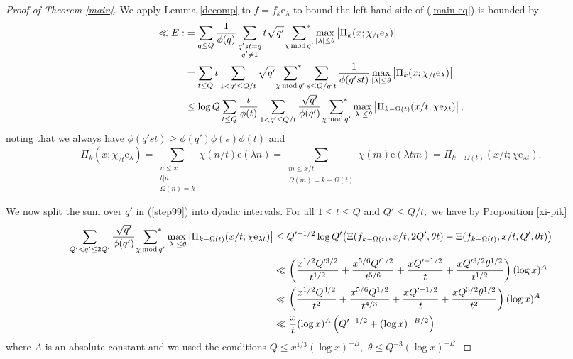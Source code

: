\documentclass[10pt,a4paper]{amsart}
\newcommand{\Mod}{\,\mathrm{mod}\,}
\newcommand{\e}{\mathrm{e}}
\newcommand{\starsum}{\ \sideset{}{^*}\sum}
\begin{document}
\begin{proof}[Proof of Theorem \ref{main}]
    We apply Lemma \ref{decomp} to $f = f_k\e_\lambda$ to bound the left-hand side of (\ref{main-eq}) is bounded by
    \begin{align}
        \ll E :&= \sum_{q\le Q} \frac{1}{\phi(q)} \sum_{\substack{q'st = q \\ q'\ne 1}} t\sqrt{q'}\starsum_{\chi\Mod q'} \max_{|\lambda|\le \theta} \left|\Pi_k(x; \chi_{/t}\e_{\lambda})\right| \notag
        \\&= \sum_{t\le Q} t \sum_{1 < q'\le Q/t} \sqrt{q'} \starsum_{\chi\Mod q'}  \sum_{s\le Q/q't} \frac{1}{\phi(q'st)} \max_{|\lambda|\le \theta} \left|\Pi_k(x; \chi_{/t}\e_{\lambda})\right| \notag
        \\&\le \log Q \sum_{t\le Q} \frac{t}{\phi(t)} \sum_{1 < q'\le Q/t} \frac{\sqrt{q'}}{\phi(q')} \starsum_{\chi\Mod q'}  \max_{|\lambda|\le \theta} \left|\Pi_{k-\Omega(t)}(x/t; \chi\e_{\lambda t})\right|, \label{step99}
    \end{align}
    noting that we always have $\phi(q'st) \ge \phi(q')\phi(s)\phi(t)$ and $$\Pi_k(x; \chi_{/t}\e_\lambda) = \sum_{\substack{n \le x \\t|n \\ \Omega(n) = k}} \chi(n/t) \e(\lambda n) = \sum_{\substack{m\le x/t \\ \Omega(m) = k - \Omega(t)}} \chi(m) \e(\lambda tm) = \Pi_{k-\Omega(t)}(x/t;\chi\e_{\lambda t}).$$

    We now split the sum over $q'$ in (\ref{step99}) into dyadic intervals. For all $1\le t\le Q$ and $Q' \le Q/t,$ we have by Proposition \ref{xi-pik}
    \begin{align}
        \sum_{Q' < q'\le 2Q'} \frac{\sqrt{q'}}{\phi(q')} \starsum_{\chi\Mod q'} \max_{|\lambda|\le \theta} \left|\Pi_{k-\Omega(t)}(x/t; \chi\e_{\lambda t})\right| &\le Q'^{-1/2} \log Q' \big(\Xi(f_{k-\Omega(t)}, x/t,2Q', \theta t) - \Xi(f_{k-\Omega(t)}, x/t,Q', \theta t)\big) \notag\\&\ll \left(\frac{x^{1/2}Q'^{3/2}}{t^{1/2}} + \frac{x^{5/6}Q'^{1/2}}{t^{5/6}} + \frac{xQ'^{-1/2}}{t} + \frac{xQ'^{3/2}\theta^{1/2}}{t^{1/2}}\right) (\log x)^A \notag 
        \\&\ll \left(\frac{x^{1/2}Q^{3/2}}{t^{2}} + \frac{x^{5/6}Q^{1/2}}{t^{4/3}} + \frac{xQ'^{-1/2}}{t} + \frac{xQ^{3/2}\theta^{1/2}}{t^{2}}\right) (\log x)^A \notag
        \\&\ll \frac{x}{t} (\log x)^A \left(Q'^{-1/2} + (\log x)^{-B/2}\right)
        \label{step100}
    \end{align} 
    where $A$ is an absolute constant and we used the conditions $Q \le x^{1/3}(\log x)^{-B},$ $\theta \le Q^{-3}(\log x)^{-B}.$


\end{proof}
\end{document}
